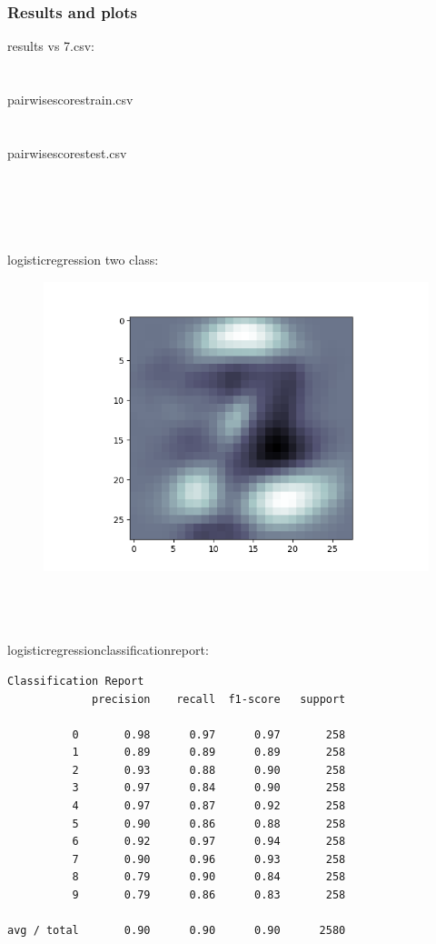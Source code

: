 \documentclass[paper=a4, fontsize=11pt]{scrartcl} %
\numberwithin{equation}{section} %
\numberwithin{figure}{section} %
\numberwithin{table}{section} %
\begin{document}
\subsubsection{Results and plots}
results \textunderscore vs \textunderscore 7.csv: \\
\\ \\
pairwise\textunderscore scores\textunderscore train.csv \\
\\ \\
pairwise\textunderscore scores\textunderscore test.csv \\
\\ \\ \\ \\ \\ 
logistic\textunderscore regression \textunderscore two \textunderscore class:
\begin{figure}[h]
\center
\includegraphics[]{lr2.png}
\end{figure}
\\ \\ \\
logistic\textunderscore regression\textunderscore classification\textunderscore report:
\begin{verbatim}
Classification Report
             precision    recall  f1-score   support

          0       0.98      0.97      0.97       258
          1       0.89      0.89      0.89       258
          2       0.93      0.88      0.90       258
          3       0.97      0.84      0.90       258
          4       0.97      0.87      0.92       258
          5       0.90      0.86      0.88       258
          6       0.92      0.97      0.94       258
          7       0.90      0.96      0.93       258
          8       0.79      0.90      0.84       258
          9       0.79      0.86      0.83       258

avg / total       0.90      0.90      0.90      2580 
\end{verbatim}
\end{document}
